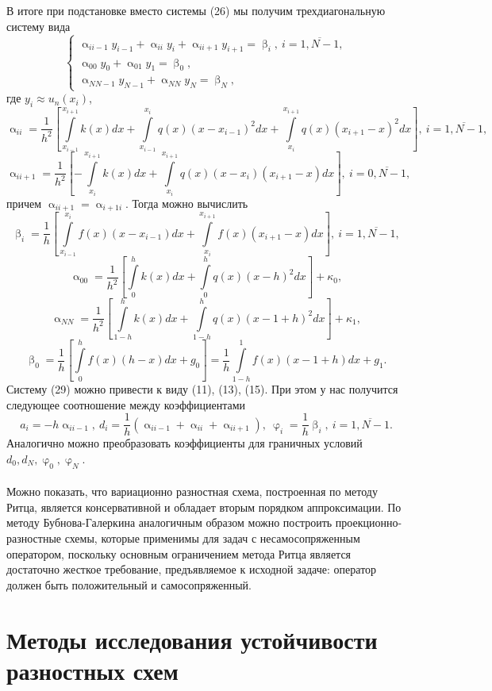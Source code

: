 \documentclass[a4paper, 12pt]{report}
\numberwithin{equation}{section}
\renewcommand{\alpha}{\upalpha}
\renewcommand{\beta}{\upbeta}
\renewcommand{\varphi}{\upvarphi}
\begin{document}
		В итоге при подстановке вместо системы (26) мы получим трехдиагональную систему вида
		\begin{equation}
			\begin{cases}
				\alpha_{ii-1} y_{i-1} + \alpha_{ii} y_i + \alpha_{i i+1} y_{i+1} = \beta_i,\ i = \overline {1, N -1},\\
				\alpha_{00} y_0 + \alpha_{01}y_1 = \beta_0,\\
				\alpha_{NN-1} y_{N-1} + \alpha_{NN}y_N = \beta_N,
			\end{cases}
		\end{equation}
		где $y_i \approx u_n(x_i)$, $$\alpha_{ii} = \dfrac{1}{h^2}\left[ \int\limits_{x_{i-1}}^{x_{i+1}} k(x)dx +\int\limits_{x_{i-1}}^{x_i}q(x)(x-x_{i-1})^2dx + \int\limits_{x_i}^{x_{i+1}}q(x)(x_{i+1}-x)^2dx \right],\ i = \overline{1, N-1},$$
		$$\alpha_{ii+1} = \dfrac{1}{h^2} \left[-\int\limits_{x_i}^{x_{i+1}}k(x)dx + \int\limits_{x_i}^{x_{i+1}}q(x)(x-x_i)(x_{i+1} - x)dx\right],\ i = \overline {0, N-1},$$
		причем $\alpha_{ii+1} = \alpha_{i+1i}$. Тогда можно вычислить
		$$\beta_i = \dfrac{1}{h} \left[\int\limits_{x_{i-1}}^{x_i}f(x)(x-x_{i-1})dx + \int\limits_{x_i}^{x_{i+1}}f(x)(x_{i+1}-x)dx\right],\ i = \overline{1, N-1},$$
		$$\alpha_{00} = \dfrac{1}{h^2}\left[\int\limits_0^h k(x)dx + \int\limits_0^h q(x)(x-h)^2dx\right] + \kappa_0,$$
		$$\alpha_{NN} = \dfrac{1}{h^2}\left[\int\limits_{1-h}^h k(x)dx + \int\limits_{1-h}^h q(x)(x-1+h)^2dx\right] + \kappa_1,$$
		$$\beta_0 = \dfrac 1h \left[\int\limits_0^h f(x)(h-x)dx + g_0\right] = \dfrac{1}{h} \int\limits_{1-h}^1 f(x)(x-1+h)dx + g_1.$$
		Систему (29) можно привести к виду (11), (13), (15). При этом у нас получится следующее соотношение между коэффициентами
		$$a_i = - h\alpha_{ii-1},\ d_i = \dfrac 1h (\alpha_{ii-1} + \alpha_{ii} + \alpha_{ii+1}),\ \varphi_i = \dfrac 1h \beta_i,\ i=\overline{1, N-1}.$$
		Аналогично можно преобразовать коэффициенты для граничных условий $d_0, d_N, \varphi_0, \varphi_N$. \\\\
		Можно показать, что вариационно разностная схема, построенная по методу Ритца, является консервативной и обладает вторым порядком аппроксимации. По методу Бубнова-Галеркина аналогичным образом можно построить проекционно-разностные схемы, которые применимы для задач с несамосопряженным оператором, поскольку основным ограничением метода Ритца является достаточно жесткое требование, предъявляемое к исходной задаче: оператор должен быть положительный и самосопряженный. 
		\section{Методы исследования устойчивости разностных схем}
\end{document}
